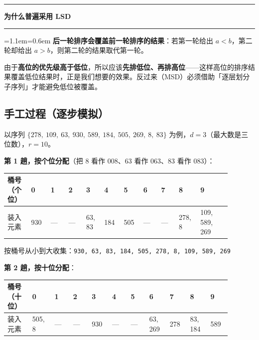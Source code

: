 \documentclass[11pt,openany,UTF8]{ctexbook}
\newcommand{\callouthead}[2]{%
  \par\addvspace{7pt}\noindent
  {\color{#1}\rule[-0.15em]{3pt}{1.05em}}\hspace{0.5em}%
  {\bfseries\color{#1}#2}\par\nobreak\vspace{-0.35em}%
  {\color{rulesep}\hrule height 0.4pt}\nobreak\vspace{0.45em}%
  \begingroup\small\setlength{\parindent}{0pt}%
  \leftskip=1.1em\rightskip=0.6em\noindent\ignorespaces}
\newcommand{\calloutend}{\par\endgroup\addvspace{7pt}}
\newenvironment{callkey}[1]{\callouthead{keybar}{#1}}{\calloutend}
\begin{document}
\begin{callkey}{为什么普遍采用 LSD}
\textbf{后一轮排序会覆盖前一轮排序的结果}：若第一轮给出 $a<b$，第二轮却给出 $a>b$，则第二轮的结果取代第一轮。

由于\textbf{高位的优先级高于低位}，所以应该\textbf{先排低位、再排高位}——这样高位的排序结果覆盖低位结果时，正是我们想要的效果。反过来（MSD）必须借助「逐层划分子序列」才能避免低位被覆盖。

\end{callkey}

\subsection{手工过程（逐步模拟）}

以序列 $\{278,\ 109,\ 63,\ 930,\ 589,\ 184,\ 505,\ 269,\ 8,\ 83\}$ 为例，$d=3$（最大数是三位数），$r=10$。

\textbf{第 1 趟，按个位分配}（把 8 看作 008、63 看作 063、83 看作 083）：

\begingroup\footnotesize\setlength{\tabcolsep}{2.0pt}
\begin{longtable}{@{}L{0.0922\linewidth}L{0.0738\linewidth}L{0.0738\linewidth}L{0.0738\linewidth}L{0.0738\linewidth}L{0.0738\linewidth}L{0.0738\linewidth}L{0.0738\linewidth}L{0.0738\linewidth}L{0.0738\linewidth}L{0.1291\linewidth}@{}}
\toprule
\textbf{桶号（个位）} & \textbf{0} & \textbf{1} & \textbf{2} & \textbf{3} & \textbf{4} & \textbf{5} & \textbf{6} & \textbf{7} & \textbf{8} & \textbf{9} \\
\midrule
\endhead
装入元素 & 930 & — & — & 63, 83 & 184 & 505 & — & — & 278, 8 & 109, 589, 269 \\
\bottomrule
\end{longtable}
\endgroup

按桶号从小到大收集：\texttt{930,\allowbreak{} 63,\allowbreak{} 83,\allowbreak{} 184,\allowbreak{} 505,\allowbreak{} 278,\allowbreak{} 8,\allowbreak{} 109,\allowbreak{} 589,\allowbreak{} 269}

\textbf{第 2 趟，按十位分配}：

\begingroup\footnotesize\setlength{\tabcolsep}{2.0pt}
\begin{longtable}{@{}L{0.0984\linewidth}L{0.0787\linewidth}L{0.0787\linewidth}L{0.0787\linewidth}L{0.0787\linewidth}L{0.0787\linewidth}L{0.0787\linewidth}L{0.0787\linewidth}L{0.0787\linewidth}L{0.0787\linewidth}L{0.0787\linewidth}@{}}
\toprule
\textbf{桶号（十位）} & \textbf{0} & \textbf{1} & \textbf{2} & \textbf{3} & \textbf{4} & \textbf{5} & \textbf{6} & \textbf{7} & \textbf{8} & \textbf{9} \\
\midrule
\endhead
装入元素 & 505, 8 & — & — & 930 & — & — & 63, 269 & 278 & 83, 184 & 589 \\
\bottomrule
\end{longtable}
\endgroup
\end{document}
